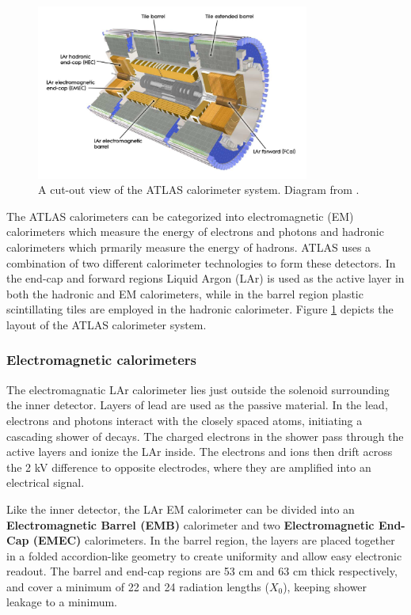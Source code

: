 \begin{figure}[H]
    \centering
    \includegraphics[width=0.8\textwidth]{Figures/2/Calo.png}
    \caption{A cut-out view of the ATLAS calorimeter system. Diagram from \cite{ATLASDesign}.}
    \label{fig:atlascalo}
\end{figure}

The ATLAS calorimeters can be categorized into electromagnetic (EM) calorimeters which measure the energy of electrons and photons and hadronic calorimeters which prmarily measure the energy of hadrons. ATLAS uses a combination of two different calorimeter technologies to form these detectors. In the end-cap and forward regions Liquid Argon (LAr) is used as the active layer in both the hadronic and EM calorimeters, while in the barrel region plastic scintillating tiles are employed in the hadronic calorimeter. Figure \ref{fig:atlascalo} depicts the layout of the ATLAS calorimeter system.

\subsubsection{Electromagnetic calorimeters}
The electromagnatic LAr calorimeter lies just outside the solenoid surrounding the inner detector. Layers of lead are used as the passive material. In the lead, electrons and photons interact with the closely spaced atoms, initiating a cascading shower of decays. The charged electrons in the shower pass through the active layers and ionize the LAr inside. The electrons and ions then drift across the 2 kV difference to opposite electrodes, where they are amplified into an electrical signal.

Like the inner detector, the LAr EM calorimeter can be divided into an \textbf{Electromagnetic Barrel (EMB)} calorimeter and two \textbf{Electromagnetic End-Cap (EMEC)} calorimeters. In the barrel region, the layers are placed together in a folded accordion-like geometry to create uniformity and allow easy electronic readout. The barrel and end-cap regions are 53 cm and 63 cm thick respectively, and cover a minimum of 22 and 24 radiation lengths ($X_0$), keeping shower leakage to a minimum.

